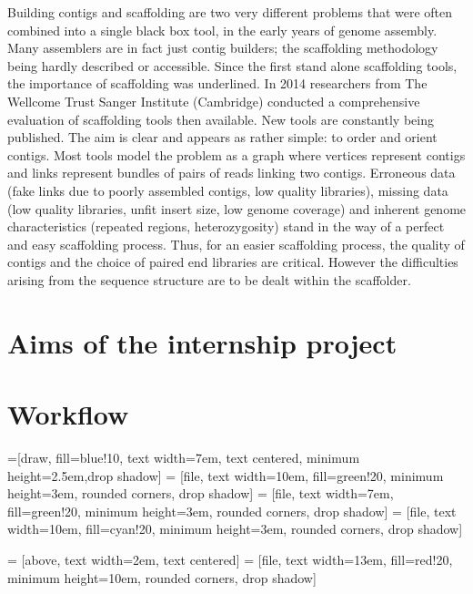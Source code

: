 \documentclass[12pt]{report}
\begin{document}
Building contigs and scaffolding are two very different problems that were often combined into a single black box tool, in the early years of genome assembly. Many assemblers are in fact just contig builders; the scaffolding methodology being hardly described or accessible. Since the first stand alone scaffolding tools, the importance of scaffolding was underlined. In 2014 researchers from The Wellcome Trust Sanger Institute (Cambridge) conducted a comprehensive evaluation of scaffolding tools then available. New tools are constantly being published. The aim is clear and appears as rather simple: to order and orient contigs. Most tools model the problem as a graph where vertices represent contigs and links represent bundles of pairs of reads linking two contigs. Erroneous data (fake links due to poorly assembled contigs, low quality libraries), missing data (low quality libraries, unfit insert size, low genome coverage) and inherent genome characteristics (repeated regions,  heterozygosity) stand in the way of a perfect and easy scaffolding process. Thus, for an easier scaffolding process, the quality of contigs and the choice of paired end libraries are critical. However the difficulties arising from the sequence structure are to be dealt within the scaffolder.

\section{Aims of the internship project}


\newpage
\section{Workflow}

=[draw, fill=blue!10, text width=7em, 
    text centered, minimum height=2.5em,drop shadow]
 = [file, text width=10em, fill=green!20, 
    minimum height=3em, rounded corners, drop shadow]
 = [file, text width=7em, fill=green!20, 
    minimum height=3em, rounded corners, drop shadow]
 = [file, text width=10em, fill=cyan!20, 
    minimum height=3em, rounded corners, drop shadow]   

 = [above, text width=2em, text centered]
 = [file, text width=13em, fill=red!20, 
    minimum height=10em, rounded corners, drop shadow]
\end{document}
